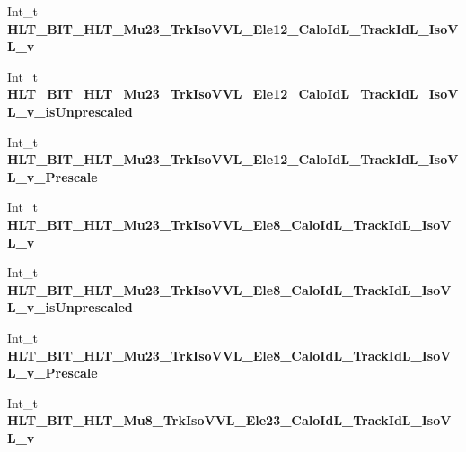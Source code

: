 \begin{DoxyCompactItemize}
\item 
\hypertarget{classMiniTree_a51c52bc9efe1b3369112306bca84258a}{}\label{classMiniTree_a51c52bc9efe1b3369112306bca84258a} 
Int\+\_\+t {\bfseries H\+L\+T\+\_\+\+B\+I\+T\+\_\+\+H\+L\+T\+\_\+\+Mu23\+\_\+\+Trk\+Iso\+V\+V\+L\+\_\+\+Ele12\+\_\+\+Calo\+Id\+L\+\_\+\+Track\+Id\+L\+\_\+\+Iso\+V\+L\+\_\+v}
\item 
\hypertarget{classMiniTree_a59f690e10c4871ebe4fa175b2088528a}{}\label{classMiniTree_a59f690e10c4871ebe4fa175b2088528a} 
Int\+\_\+t {\bfseries H\+L\+T\+\_\+\+B\+I\+T\+\_\+\+H\+L\+T\+\_\+\+Mu23\+\_\+\+Trk\+Iso\+V\+V\+L\+\_\+\+Ele12\+\_\+\+Calo\+Id\+L\+\_\+\+Track\+Id\+L\+\_\+\+Iso\+V\+L\+\_\+v\+\_\+is\+Unprescaled}
\item 
\hypertarget{classMiniTree_a2e3b7d33e25b9ab83c3b6dc3e206ba8d}{}\label{classMiniTree_a2e3b7d33e25b9ab83c3b6dc3e206ba8d} 
Int\+\_\+t {\bfseries H\+L\+T\+\_\+\+B\+I\+T\+\_\+\+H\+L\+T\+\_\+\+Mu23\+\_\+\+Trk\+Iso\+V\+V\+L\+\_\+\+Ele12\+\_\+\+Calo\+Id\+L\+\_\+\+Track\+Id\+L\+\_\+\+Iso\+V\+L\+\_\+v\+\_\+\+Prescale}
\item 
\hypertarget{classMiniTree_a17bd68ea7db63a0cf6630980f6e1a978}{}\label{classMiniTree_a17bd68ea7db63a0cf6630980f6e1a978} 
Int\+\_\+t {\bfseries H\+L\+T\+\_\+\+B\+I\+T\+\_\+\+H\+L\+T\+\_\+\+Mu23\+\_\+\+Trk\+Iso\+V\+V\+L\+\_\+\+Ele8\+\_\+\+Calo\+Id\+L\+\_\+\+Track\+Id\+L\+\_\+\+Iso\+V\+L\+\_\+v}
\item 
\hypertarget{classMiniTree_abdbfc6019311345284037e55fd39aae1}{}\label{classMiniTree_abdbfc6019311345284037e55fd39aae1} 
Int\+\_\+t {\bfseries H\+L\+T\+\_\+\+B\+I\+T\+\_\+\+H\+L\+T\+\_\+\+Mu23\+\_\+\+Trk\+Iso\+V\+V\+L\+\_\+\+Ele8\+\_\+\+Calo\+Id\+L\+\_\+\+Track\+Id\+L\+\_\+\+Iso\+V\+L\+\_\+v\+\_\+is\+Unprescaled}
\item 
\hypertarget{classMiniTree_a053463ba90487a1424c0b99f383f4b68}{}\label{classMiniTree_a053463ba90487a1424c0b99f383f4b68} 
Int\+\_\+t {\bfseries H\+L\+T\+\_\+\+B\+I\+T\+\_\+\+H\+L\+T\+\_\+\+Mu23\+\_\+\+Trk\+Iso\+V\+V\+L\+\_\+\+Ele8\+\_\+\+Calo\+Id\+L\+\_\+\+Track\+Id\+L\+\_\+\+Iso\+V\+L\+\_\+v\+\_\+\+Prescale}
\item 
\hypertarget{classMiniTree_a6a18d117e36a8b0d2d4404119f5be627}{}\label{classMiniTree_a6a18d117e36a8b0d2d4404119f5be627} 
Int\+\_\+t {\bfseries H\+L\+T\+\_\+\+B\+I\+T\+\_\+\+H\+L\+T\+\_\+\+Mu8\+\_\+\+Trk\+Iso\+V\+V\+L\+\_\+\+Ele23\+\_\+\+Calo\+Id\+L\+\_\+\+Track\+Id\+L\+\_\+\+Iso\+V\+L\+\_\+v}
\item 
\hypertarget{classMiniTree_a5b7e4973e4274f839fb1e2765fe47325}{}\label{classMiniTree_a5b7e4973e4274f839fb1e2765fe47325} 

\end{DoxyCompactItemize}

